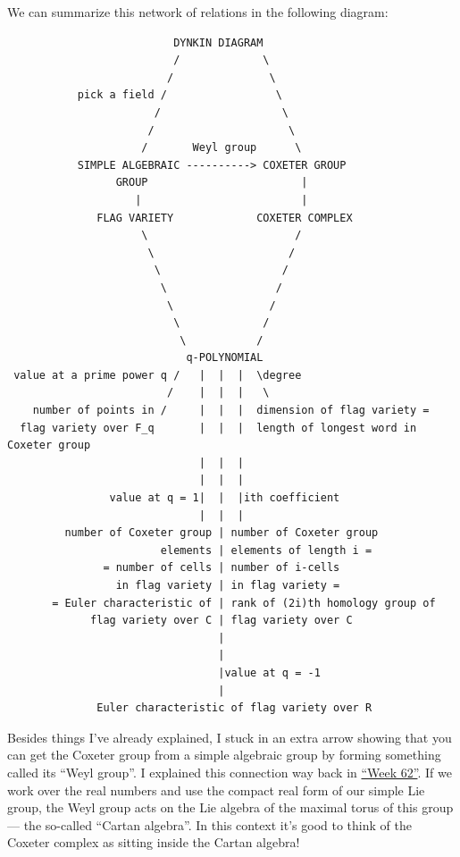\documentclass{article}
\begin{document}
We can summarize this network of relations in the following diagram:

\begin{verbatim}
                          DYNKIN DIAGRAM
                          /             \
                         /               \
           pick a field /                 \ 
                       /                   \
                      /                     \
                     /       Weyl group      \
           SIMPLE ALGEBRAIC ----------> COXETER GROUP 
                 GROUP                        | 
                    |                         | 
              FLAG VARIETY             COXETER COMPLEX 
                     \                       /
                      \                     /
                       \                   /
                        \                 /
                         \               /
                          \             /
                           \           /
                            q-POLYNOMIAL
 value at a prime power q /   |  |  |  \degree
                         /    |  |  |   \
    number of points in /     |  |  |  dimension of flag variety =
  flag variety over F_q       |  |  |  length of longest word in Coxeter group
                              |  |  |
                              |  |  |
                value at q = 1|  |  |ith coefficient
                              |  |  |
         number of Coxeter group | number of Coxeter group 
                        elements | elements of length i =
               = number of cells | number of i-cells  
                 in flag variety | in flag variety = 
       = Euler characteristic of | rank of (2i)th homology group of
             flag variety over C | flag variety over C
                                 |
                                 |
                                 |value at q = -1
                                 |
              Euler characteristic of flag variety over R 
\end{verbatim}

Besides things I've already explained, I stuck in an extra arrow showing
that you can get the Coxeter group from a simple algebraic group by
forming something called its ``Weyl group''. I explained this connection
way back in \protect\hyperlink{week62}{``Week 62''}. If we work over the
real numbers and use the compact real form of our simple Lie group, the
Weyl group acts on the Lie algebra of the maximal torus of this group
--- the so-called ``Cartan algebra''. In this context it's good to think
of the Coxeter complex as sitting inside the Cartan algebra!
\end{document}
